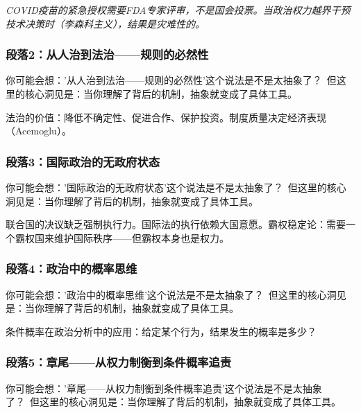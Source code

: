 \documentclass[a4paper,12pt]{book}
\newenvironment{motivation}{\begin{tcolorbox}[colback=gray!10,colframe=gray!60,title=\textit{本章动机 (Motivation)},fonttitle=\bfseries,arc=0mm,leftrule=3mm]\small\itshape}{\end{tcolorbox}}
\begin{document}
\begin{motivation}
\begin{motivation}
\begin{motivation}
COVID疫苗的紧急授权需要FDA专家评审，不是国会投票。当政治权力越界干预技术决策时（李森科主义），结果是灾难性的。

	\subsubsection*{段落2：从人治到法治——规则的必然性}

	\begin{tcolorbox}[colback=yellow!5, title=\textit{读者行为预测}]
		你可能会想：'从人治到法治——规则的必然性'这个说法是不是太抽象了？\ 但这里的核心洞见是：当你理解了背后的机制，抽象就变成了具体工具。
	\end{tcolorbox}

法治的价值：降低不确定性、促进合作、保护投资。制度质量决定经济表现（Acemoglu）。

	\subsubsection*{段落3：国际政治的无政府状态}

	\begin{tcolorbox}[colback=yellow!5, title=\textit{读者行为预测}]
		你可能会想：'国际政治的无政府状态'这个说法是不是太抽象了？\ 但这里的核心洞见是：当你理解了背后的机制，抽象就变成了具体工具。
	\end{tcolorbox}

联合国的决议缺乏强制执行力。国际法的执行依赖大国意愿。霸权稳定论：需要一个霸权国来维护国际秩序——但霸权本身也是权力。

	\subsubsection*{段落4：政治中的概率思维}

	\begin{tcolorbox}[colback=yellow!5, title=\textit{读者行为预测}]
		你可能会想：'政治中的概率思维'这个说法是不是太抽象了？\ 但这里的核心洞见是：当你理解了背后的机制，抽象就变成了具体工具。
	\end{tcolorbox}

条件概率在政治分析中的应用：给定某个行为，结果发生的概率是多少？

	\subsubsection*{段落5：章尾——从权力制衡到条件概率追责}

	\begin{tcolorbox}[colback=yellow!5, title=\textit{读者行为预测}]
		你可能会想：'章尾——从权力制衡到条件概率追责'这个说法是不是太抽象了？\ 但这里的核心洞见是：当你理解了背后的机制，抽象就变成了具体工具。
	\end{tcolorbox}


\end{motivation}
\end{motivation}
\end{motivation}
\end{document}
